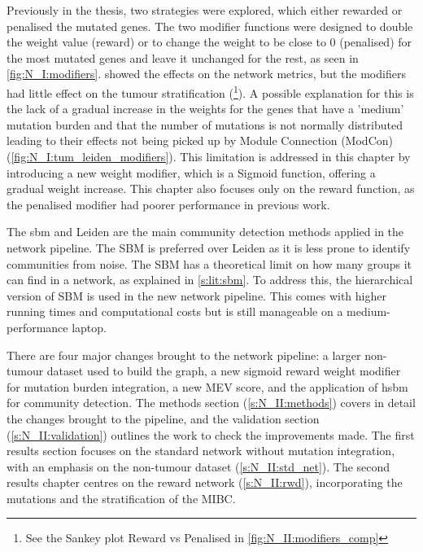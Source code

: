 Previously in the thesis, two strategies were explored, which either rewarded or penalised the mutated genes. The two modifier functions were designed to double the weight value (reward) or to change the weight to be close to 0 (penalised) for the most mutated genes and leave it unchanged for the rest, as seen in \cref{fig:N_I:modifiers}.  showed the effects on the network metrics, but the modifiers had little effect on the tumour stratification (\footnote{See the Sankey plot Reward vs Penalised in \cref{fig:N_II:modifiers_comp}}). A possible explanation for this is the lack of a gradual increase in the weights for the genes that have a 'medium' mutation burden and that the number of mutations is not normally distributed leading to their effects not being picked up by Module Connection (ModCon) (\cref{fig:N_I:tum_leiden_modifiers}). This limitation is addressed in this chapter by introducing a new weight modifier, which is a Sigmoid function, offering a gradual weight increase. This chapter also focuses only on the reward function, as the penalised modifier had poorer performance in previous work.


The \acrfull{sbm} and Leiden are the main community detection methods applied in the network pipeline. The SBM is preferred over Leiden as it is less prone to identify communities from noise. The SBM has a theoretical limit on how many groups it can find in a network, as explained in \cref{s:lit:sbm}. To address this, the hierarchical version of SBM is used in the new network pipeline. This comes with higher running times and computational costs but is still manageable on a medium-performance laptop.

There are four major changes brought to the network pipeline: a larger non-tumour dataset used to build the graph, a new sigmoid reward weight modifier for mutation burden integration, a new MEV score, and the application of \acrfull{hsbm} for community detection. The methods section (\ref{s:N_II:methods}) covers in detail the changes brought to the pipeline, and the validation section (\ref{s:N_II:validation}) outlines the work to check the improvements made. The first results section focuses on the standard network without mutation integration, with an emphasis on the non-tumour dataset (\cref{s:N_II:std_net}). The second results chapter centres on the reward network (\cref{s:N_II:rwd}), incorporating the mutations and the stratification of the MIBC.


